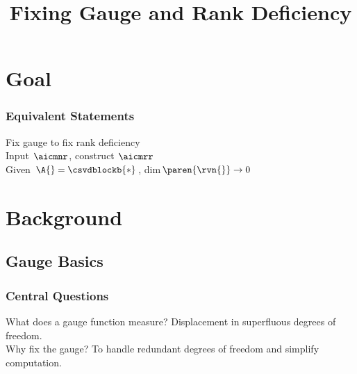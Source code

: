 \documentclass[handout]{beamer}
\title{Fixing Gauge and Rank Deficiency}
\author[\mg{\fontsize{5}{15}\selectfont DISTRIBUTION A. Approved for public release: distribution unlimited.}]{}
\begin{document}

\tpage

\section{Goal}

\begin{frame}      %
\frametitle{Equivalent Statements}
  Fix gauge to fix rank deficiency \\[20pt]
  \pause
  Input $\aicmnr$, construct $\aicmrr$  \\[20pt]
  \pause
  Given $\A{} = \csvdblockb{*}$, dim$\paren{\rvn{}} \to 0$
\end{frame}


\section{Background}

\subsection{Gauge Basics}

\begin{frame}      %
\frametitle{Central Questions}
  What does a gauge function measure?  Displacement in superfluous degrees of freedom.\\[20pt]
  \pause
  Why fix the gauge? To handle redundant degrees of freedom and simplify computation.
\end{frame}
\end{document}
